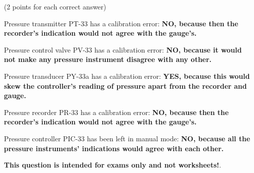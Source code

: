 
(2 points for each correct answer)

\vskip 10pt

Pressure transmitter PT-33 has a calibration error: {\bf NO, because then the recorder's indication would not agree with the gauge's.}

\vskip 10pt

Pressure control valve PV-33 has a calibration error: {\bf NO, because it would not make any pressure instrument disagree with any other.}

\vskip 10pt

Pressure transducer PY-33a has a calibration error: {\bf YES, because this would skew the controller's reading of pressure apart from the recorder and gauge.}

\vskip 10pt

Pressure recorder PR-33 has a calibration error: {\bf NO, because then the recorder's indication would not agree with the gauge's.}

\vskip 10pt

Pressure controller PIC-33 has been left in manual mode: {\bf NO, because all the pressure instruments' indications would agree with each other.}

\vskip 10pt








{\bf This question is intended for exams only and not worksheets!}.



